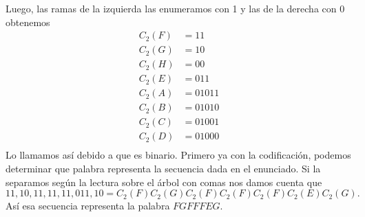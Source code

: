 \begin{sols}
\begin{center}
    \end{center}
Luego, las ramas de la izquierda las enumeramos con 1 y las de la derecha con 0 obtenemos
\begin{align*}
    C_2(F)&=11\\
    C_2(G)&=10\\
    C_2(H)&=00\\
    C_2(E)&=011\\
    C_2(A)&=01011\\
    C_2(B)&=01010\\
    C_2(C)&=01001\\
    C_2(D)&=01000\\
\end{align*}
Lo llamamos así debido a que es binario. Primero ya con la codificación, podemos determinar que palabra representa la secuencia dada en el enunciado. Si la separamos según la lectura sobre el árbol con comas nos damos cuenta que
$$11,10,11,11,11,011,10=C_2(F)C_2(G)C_2(F)C_2(F)C_2(F)C_2(E)C_2(G).$$
Así esa secuencia representa la palabra $FGFFFEG.$\\


\end{sols}
